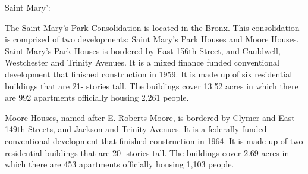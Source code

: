 Saint Mary':    

  

The Saint Mary's Park Consolidation is located in the Bronx. This consolidation is comprised of two developments: Saint Mary's Park Houses and Moore Houses. Saint Mary's Park Houses is bordered by East 156th Street, and Cauldwell, Westchester and Trinity Avenues. It is a mixed finance funded conventional development that finished construction in 1959. It is made up of six residential buildings that are 21- stories tall. The buildings cover 13.52 acres in which there are 992 apartments officially housing 2,261 people.

Moore Houses, named after E. Roberts Moore, is bordered by Clymer and East 149th Streets, and Jackson and Trinity Avenues. It is a federally funded conventional development that finished construction in 1964. It is made up of two residential buildings that are 20- stories tall. The buildings cover 2.69 acres in which there are 453 apartments officially housing 1,103 people.